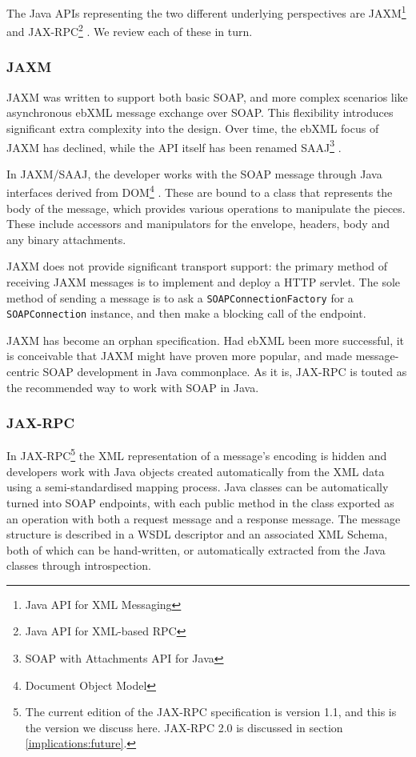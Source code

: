 The Java APIs representing the two different underlying perspectives
are JAXM\footnote{Java API for XML Messaging}
\cite{spec:JAX-M-11} and JAX-RPC\footnote{Java API for XML-based RPC}
\cite{spec:JAX-RPC-11}. We review each of these in turn.

\subsubsection{JAXM}
\label{intro:jaxm}

JAXM was written to support both basic SOAP, and more complex
scenarios like asynchronous ebXML message exchange over SOAP. This
flexibility introduces significant extra complexity into the design.
Over time, the ebXML focus of JAXM has declined, while the API itself
has been renamed SAAJ\footnote{SOAP with Attachments API for Java}
\cite{spec:SAAJ-12}.

In JAXM/SAAJ, the developer works with the SOAP message through Java
interfaces derived from DOM\footnote{Document Object Model}
\cite{spec:DOM}. These are bound to a class that represents the body
of the message, which provides various operations to manipulate the
pieces. These include accessors and manipulators for the envelope,
headers, body and any binary attachments.

JAXM does not provide significant transport support: the primary
method of receiving JAXM messages is to implement and deploy a HTTP
servlet.  The sole method of sending a message is to ask a
{\tt SOAPConnectionFactory} for a {\tt SOAPConnection} instance, and
then make a blocking call of the endpoint.

JAXM has become an orphan specification. Had ebXML been more
successful, it is conceivable that JAXM might have proven more
popular, and made message-centric SOAP development in Java
commonplace. As it is, JAX-RPC is touted as the recommended way to
work with SOAP in Java.

\subsubsection{JAX-RPC}
\label{intro:jax-rpc}

In JAX-RPC\footnote{The current edition of the JAX-RPC specification
is version 1.1, and this is the version we discuss here. JAX-RPC 2.0
is discussed in section \ref{implications:future}.} the XML
representation of a message's encoding is hidden and developers work
with Java objects created automatically from the XML data using a
semi-standardised mapping process. Java classes can be automatically
turned into SOAP endpoints, with each public method in the class
exported as an operation with both a request message and a response
message. The message structure is described in a WSDL descriptor and
an associated XML Schema, both of which can be hand-written, or
automatically extracted from the Java classes through introspection.

